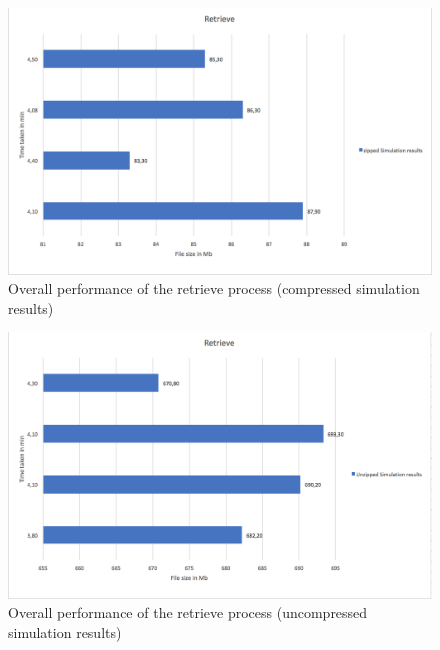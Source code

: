 \begin{figure}[H]
    \centering \includegraphics[scale=0.7]{grafiken/retrieveZip.png}
    \caption{Overall performance of the retrieve process (compressed simulation results)}
    \label{fig:restorePerformance}
\end{figure}

\begin{figure}[H]
    \centering \includegraphics[scale=0.7]{grafiken/retrieveUnzip.png}
    \caption{Overall performance of the retrieve process (uncompressed simulation results)}
    \label{fig:restorePerformanceUn}
\end{figure}